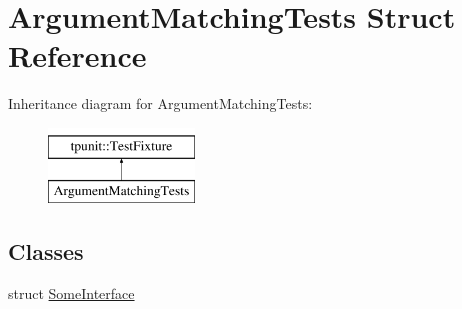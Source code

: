 \hypertarget{structArgumentMatchingTests}{}\section{Argument\+Matching\+Tests Struct Reference}
\label{structArgumentMatchingTests}
Inheritance diagram for Argument\+Matching\+Tests\+:\begin{figure}[H]
\begin{center}
\leavevmode
\includegraphics[height=2.000000cm]{structArgumentMatchingTests}
\end{center}
\end{figure}
\subsection*{Classes}
\begin{DoxyCompactItemize}
\item 
struct \mbox{\hyperlink{structArgumentMatchingTests_1_1SomeInterface}{Some\+Interface}}
\end{DoxyCompactItemize}
